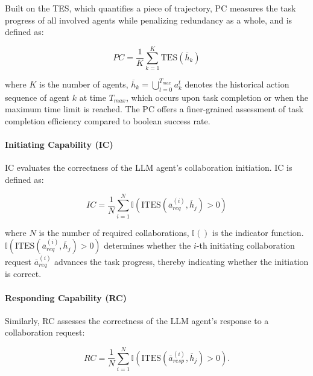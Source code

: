 \documentclass[11pt]{article}
\begin{document}
Built on the TES, which quantifies a piece of trajectory, PC measures the task progress of all involved agents while penalizing redundancy as a whole, and is defined as: 


\begin{equation}
    PC = \frac{1}{K}\sum_{k=1}^K\text{TES}(\overline{h}_k) 
\end{equation}

\noindent where $K$ is the number of agents, $\overline{h}_k = \bigcup_{t=0}^{T_{max}}a_k^t$ denotes the historical action sequence of agent $k$ at time $T_{max}$, which occurs upon task completion or when the maximum time limit is reached. The PC offers a finer-grained assessment of task completion efficiency compared to boolean success rate.


\paragraph{Initiating Capability (IC)}

IC evaluates the correctness of the LLM agent’s collaboration initiation. IC is defined as:  

\begin{equation}
    IC= \frac{1}{N} \sum_{i=1}^{N} \mathbb{I}\left( \text{ITES}(\overline{a}_{req}^{(i)}, \overline{h}_j) > 0 \right)
\end{equation}

\noindent where $N$ is the number of required collaborations, $\mathbb{I}()$ is the indicator function. $\mathbb{I}\left( \text{ITES}(\overline{a}_{req}^{(i)}, \overline{h}_j) > 0 \right)$ determines whether the $i$-th initiating collaboration request $\overline{a}_{req}^{(i)}$ advances the task progress, thereby indicating whether the initiation is correct. 

\paragraph{Responding Capability (RC)}

Similarly, RC assesses the correctness of the LLM agent's response to a collaboration request:

\begin{equation}
    RC= \frac{1}{N} \sum_{i=1}^{N} \mathbb{I}\left( \text{ITES}(\overline{a}_{resp}^{(i)}, \overline{h}_j) > 0 \right).
\end{equation}



\end{document}
